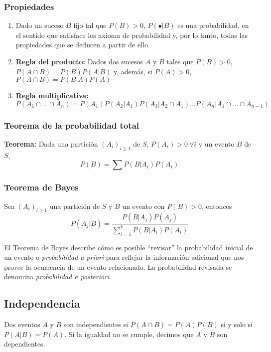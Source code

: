\subsubsection{Propiedades}

\begin{enumerate}
\item Dado un suceso $B$ fijo tal que $P(B) > 0$, $P(\bullet | B)$ es una probabilidad, en el sentido que satisface los axioma de probabilidad y, por lo tanto, todas las propiedades que se deducen a partir de ello.
\item \textbf{Regla del producto:} Dados dos sucesos $A$ y $B$ tales que $P(B)>0$, $P(A\cap B) = P(B)P(A|B)$ y, además, si $P(A) > 0$, $P(A\cap B) = P(B|A)P(A)$
\item \textbf{Regla multiplicativa:} $P(A_1\cap ...\cap A_n) = P(A_1)P(A_2 | A_1)P(A_3 | A_2\cap A_1)...P(A_n | A_1\cap...\cap A_{n-1})$
\end{enumerate}

\subsubsection{Teorema de la probabilidad total}
\textbf{Teorema:} Dada una partición $(A_i)_{i\geq1}$ de $S$, $P(A_i) > 0~\forall i$ y un evento $B$ de $S$, $$P(B) = \sum P(B|A_i)P(A_i)$$

\subsubsection{Teorema de Bayes}
Sea $(A_i)_{i\geq1}$ una partición de $S$ y $B$ un evento con $P(B) > 0$, entonces $$P(A_j | B) = \frac{P(B | A_j)P(A_j)}{\sum_{i=1}^{k} P(B|A_i)P(A_i)}$$

El Teorema de Bayes describe cómo es posible ``revisar'' la probabilidad inicial de un evento o \textit{probabilidad a priori} para reflejar la información adicional que nos provee la ocurrencia de un evento relacionado. La probabilidad revisada se denomina \textit{probabilidad a posteriori}

\subsection{Independencia}
Dos eventos $A$ y $B$ son independientes si $P(A\cap B) = P(A)P(B)$ si y solo si $P(A|B) = P(A)$.
Si la igualdad no se cumple, decimos que $A$ y $B$ son dependientes.

